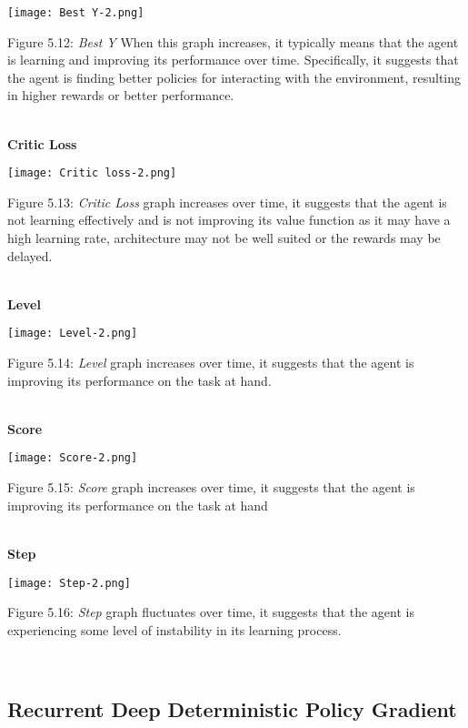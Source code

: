 \documentclass[conference]{IEEEtran}
\begin{document}
\graphicspath{ {./images/} }
\texttt{[image: Best Y-2.png]}
\caption{Figure 5.12: \textit{Best Y } When this graph increases, it typically means that the agent is learning and improving its performance over time. Specifically, it suggests that the agent is finding better policies for interacting with the environment, resulting in higher rewards or better performance.
}\\


\textbf{Critic Loss}\\

\graphicspath{ {./images/} }
\texttt{[image: Critic loss-2.png]}
\caption{Figure 5.13: \textit{Critic Loss } graph increases over time, it suggests that the agent is not learning effectively and is not improving its value function as it may have a high learning rate, architecture may not be well suited or the rewards may be delayed.
}\\

\textbf{Level}\\

\graphicspath{ {./images/} }
\texttt{[image: Level-2.png]}
\caption{Figure 5.14: \textit{Level }graph increases over time, it suggests that the agent is improving its performance on the task at hand.
}\\



\textbf{Score}\\

\graphicspath{ {./images/} }
\texttt{[image: Score-2.png]}
\caption{Figure 5.15: \textit{Score } graph increases over time, it suggests that the agent is improving its performance on the task at hand
}\\


\textbf{Step}\\

\graphicspath{ {./images/} }
\texttt{[image: Step-2.png]}
\caption{Figure 5.16: \textit{Step }graph fluctuates over time, it suggests that the agent is experiencing some level of instability in its learning process.
}\\

\subsection{Recurrent Deep Deterministic Policy Gradient}\\
\end{document}
